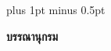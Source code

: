
\clearpage
\thispagestyle{plain}

\begingroup
\fontsize{16pt}{19.2pt}\selectfont
\justifying
\XeTeXlinebreakskip=0pt plus 1pt minus 0.5pt
\setlength{\parindent}{1.5cm}
\setlength{\parskip}{0pt}

\begin{center}
	{\bfseries\fontsize{16pt}{19.2pt}\selectfont บรรณานุกรม}
\end{center}

\vspace{\baselineskip}


